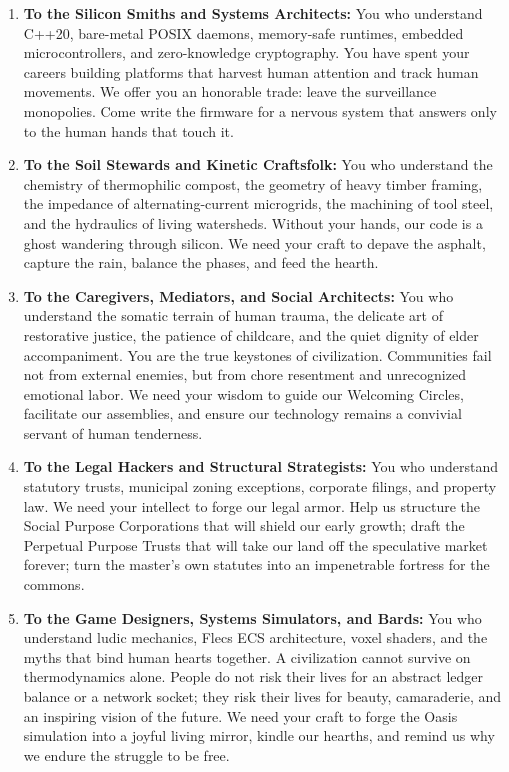 \begin{enumerate}
    \item \textbf{To the Silicon Smiths and Systems Architects:} 
    You who understand C++20, bare-metal POSIX daemons, memory-safe runtimes, embedded microcontrollers, and zero-knowledge cryptography. You have spent your careers building platforms that harvest human attention and track human movements. We offer you an honorable trade: leave the surveillance monopolies. Come write the firmware for a nervous system that answers only to the human hands that touch it.
    \item \textbf{To the Soil Stewards and Kinetic Craftsfolk:}
    You who understand the chemistry of thermophilic compost, the geometry of heavy timber framing, the impedance of alternating-current microgrids, the machining of tool steel, and the hydraulics of living watersheds. Without your hands, our code is a ghost wandering through silicon. We need your craft to depave the asphalt, capture the rain, balance the phases, and feed the hearth.
    \item \textbf{To the Caregivers, Mediators, and Social Architects:}
    You who understand the somatic terrain of human trauma, the delicate art of restorative justice, the patience of childcare, and the quiet dignity of elder accompaniment. You are the true keystones of civilization. Communities fail not from external enemies, but from chore resentment and unrecognized emotional labor. We need your wisdom to guide our Welcoming Circles, facilitate our assemblies, and ensure our technology remains a convivial servant of human tenderness.
    \item \textbf{To the Legal Hackers and Structural Strategists:}
    You who understand statutory trusts, municipal zoning exceptions, corporate filings, and property law. We need your intellect to forge our legal armor. Help us structure the Social Purpose Corporations that will shield our early growth; draft the Perpetual Purpose Trusts that will take our land off the speculative market forever; turn the master's own statutes into an impenetrable fortress for the commons.
    \item \textbf{To the Game Designers, Systems Simulators, and Bards:}
    You who understand ludic mechanics, Flecs ECS architecture, voxel shaders, and the myths that bind human hearts together. A civilization cannot survive on thermodynamics alone. People do not risk their lives for an abstract ledger balance or a network socket; they risk their lives for beauty, camaraderie, and an inspiring vision of the future. We need your craft to forge the Oasis simulation into a joyful living mirror, kindle our hearths, and remind us why we endure the struggle to be free.
\end{enumerate}

